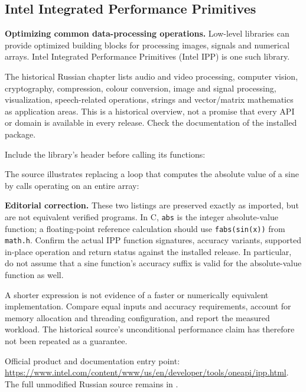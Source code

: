 { %
\subsection{Intel Integrated Performance Primitives}
\label{IPP:section}
\par\textbf{Optimizing common data-processing operations.} Low-level libraries can provide optimized building blocks for processing images, signals and numerical arrays. Intel Integrated Performance Primitives (Intel IPP) is one such library.
\par The historical Russian chapter lists audio and video processing, computer vision, cryptography, compression, colour conversion, image and signal processing, visualization, speech-related operations, strings and vector/matrix mathematics as application areas. This is a historical overview, not a promise that every API or domain is available in every release. Check the documentation of the installed package.
\par Include the library's header before calling its functions:

\par The source illustrates replacing a loop that computes the absolute value of a sine by calls operating on an entire array:


\par\textbf{Editorial correction.} These two listings are preserved exactly as imported, but are not equivalent verified programs. In C, \texttt{abs} is the integer absolute-value function; a floating-point reference calculation should use \texttt{fabs(sin(x))} from \texttt{math.h}. Confirm the actual IPP function signatures, accuracy variants, supported in-place operation and return status against the installed release. In particular, do not assume that a sine function's accuracy suffix is valid for the absolute-value function as well.
\par A shorter expression is not evidence of a faster or numerically equivalent implementation. Compare equal inputs and accuracy requirements, account for memory allocation and threading configuration, and report the measured workload. The historical source's unconditional performance claim has therefore not been repeated as a guarantee.
\par Official product and documentation entry point: \url{https://www.intel.com/content/www/us/en/developer/tools/oneapi/ipp.html}. The full unmodified Russian source remains in .
}
